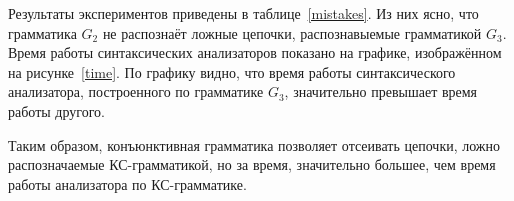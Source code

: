 Результаты экспериментов приведены в таблице~\ref{mistakes}. Из них ясно, что грамматика $G_2$ не распознаёт ложные цепочки, распознавыемые грамматикой $G_3$. Время работы синтаксических анализаторов показано на графике, изображённом на рисунке~\ref{time}. По графику видно, что время работы синтаксического анализатора, построенного по грамматике $G_3$, значительно превышает время работы другого.

Таким образом, конъюнктивная грамматика позволяет отсеивать цепочки, ложно распозначаемые КС-грамматикой, но за время, значительно большее, чем время работы анализатора по КС-грамматике.
